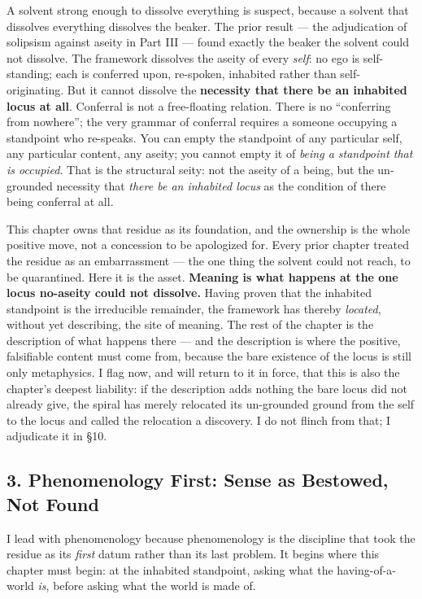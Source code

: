 \documentclass[11pt]{article}
\begin{document}
A solvent strong enough to dissolve everything is suspect, because a solvent that dissolves everything dissolves the beaker. The prior result — the adjudication of solipsism against aseity in Part III — found exactly the beaker the solvent could not dissolve. The framework dissolves the aseity of every \emph{self}: no ego is self-standing; each is conferred upon, re-spoken, inhabited rather than self-originating. But it cannot dissolve the \textbf{necessity that there be an inhabited locus at all}. Conferral is not a free-floating relation. There is no ``conferring from nowhere''; the very grammar of conferral requires a someone occupying a standpoint who re-speaks. You can empty the standpoint of any particular self, any particular content, any aseity; you cannot empty it of \emph{being a standpoint that is occupied}. That is the structural seity: not the aseity of a being, but the un-grounded necessity that \emph{there be an inhabited locus} as the condition of there being conferral at all.

This chapter owns that residue as its foundation, and the ownership is the whole positive move, not a concession to be apologized for. Every prior chapter treated the residue as an embarrassment — the one thing the solvent could not reach, to be quarantined. Here it is the asset. \textbf{Meaning is what happens at the one locus no-aseity could not dissolve.} Having proven that the inhabited standpoint is the irreducible remainder, the framework has thereby \emph{located}, without yet describing, the site of meaning. The rest of the chapter is the description of what happens there — and the description is where the positive, falsifiable content must come from, because the bare existence of the locus is still only metaphysics. I flag now, and will return to it in force, that this is also the chapter's deepest liability: if the description adds nothing the bare locus did not already give, the spiral has merely relocated its un-grounded ground from the self to the locus and called the relocation a discovery. I do not flinch from that; I adjudicate it in §10.

\subsection*{3. Phenomenology First: Sense as Bestowed, Not Found}

I lead with phenomenology because phenomenology is the discipline that took the residue as its \emph{first} datum rather than its last problem. It begins where this chapter must begin: at the inhabited standpoint, asking what the having-of-a-world \emph{is}, before asking what the world is made of.
\end{document}
